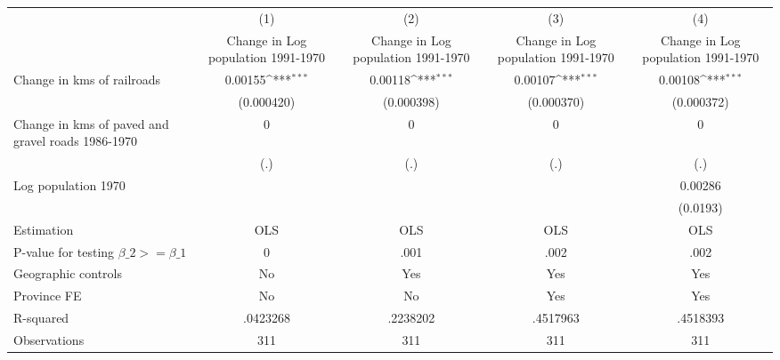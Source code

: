 {
\def\sym#1{\ifmmode^{#1}\else\(^{#1}\)\fi}
\begin{tabular}{l*{4}{c}}
\hline\hline
                &\multicolumn{1}{c}{(1)}&\multicolumn{1}{c}{(2)}&\multicolumn{1}{c}{(3)}&\multicolumn{1}{c}{(4)}\\
                &\multicolumn{1}{c}{Change in Log population 1991-1970}&\multicolumn{1}{c}{Change in Log population 1991-1970}&\multicolumn{1}{c}{Change in Log population 1991-1970}&\multicolumn{1}{c}{Change in Log population 1991-1970}\\
\hline
Change in kms of railroads&  0.00155\sym{***}&  0.00118\sym{***}&  0.00107\sym{***}&  0.00108\sym{***}\\
                &(0.000420)         &(0.000398)         &(0.000370)         &(0.000372)         \\
[1em]
Change in kms of paved and gravel roads 1986-1970&        0         &        0         &        0         &        0         \\
                &      (.)         &      (.)         &      (.)         &      (.)         \\
[1em]
Log population 1970&                  &                  &                  &  0.00286         \\
                &                  &                  &                  & (0.0193)         \\
\hline
Estimation      &      OLS         &      OLS         &      OLS         &      OLS         \\
P-value for testing $\beta\_2 >= \beta\_1$&        0         &     .001         &     .002         &     .002         \\
Geographic controls&       No         &      Yes         &      Yes         &      Yes         \\
Province FE     &       No         &       No         &      Yes         &      Yes         \\
R-squared       & .0423268         & .2238202         & .4517963         & .4518393         \\
Observations    &      311         &      311         &      311         &      311         \\
\hline\hline
\end{tabular}
}
